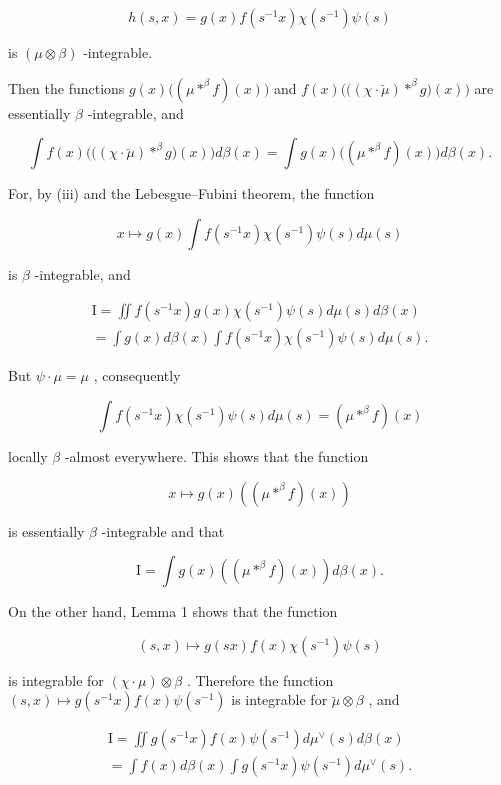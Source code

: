 \[
h (s, x) = g (x) f \left(s ^ {- 1} x\right) \chi \left(s ^ {- 1}\right) \psi (s)
\]

is \((\mu \otimes \beta)\) -integrable.

Then the functions \(g(x)\big((\mu * ^ {\beta} f)(x)\big)\) and \(f(x)\big(\big((\chi \cdot \breve{\mu}) * ^ {\beta} g\big)(x)\big)\) are essentially \(\beta\) -integrable, and

\[
\int f (x) \big (\big ((\chi \cdot \breve {\mu}) * ^ {\beta} g \big) (x) \big) d \beta (x) = \int g (x) \big ((\mu * ^ {\beta} f) (x) \big) d \beta (x).\tag{8}
\]

For, by (iii) and the Lebesgue--Fubini theorem, the function

\[
x \mapsto g (x) \int f (s ^ {- 1} x) \chi (s ^ {- 1}) \psi (s) d \mu (s)
\]

is \(\beta\) -integrable, and

\[
\begin{array}{l} \mathrm{I} = \iint f (s ^ {- 1} x) g (x) \chi (s ^ {- 1}) \psi (s) d \mu (s) d \beta (x) \\ = \int g (x) d \beta (x) \int f (s ^ {- 1} x) \chi (s ^ {- 1}) \psi (s) d \mu (s). \end{array}
\]

But \(\psi \cdot \mu = \mu\) , consequently

\[
\int f (s ^ {- 1} x) \chi (s ^ {- 1}) \psi (s) d \mu (s) = (\mu * ^ {\beta} f) (x)
\]

locally \(\beta\) -almost everywhere. This shows that the function

\[
x \mapsto g (x) \left(\left(\mu * ^ {\beta} f\right) (x)\right)
\]

is essentially \(\beta\) -integrable and that

\[
\mathrm{I} = \int g (x) \left(\left(\mu * ^ {\beta} f\right) (x)\right) d \beta (x).
\]

On the other hand, Lemma 1 shows that the function

\[
(s, x) \mapsto g (s x) f (x) \chi (s ^ {- 1}) \psi (s)
\]

is integrable for \((\chi \cdot \mu) \otimes \beta\) . Therefore the function \((s, x) \mapsto g(s^{-1}x)f(x)\psi(s^{-1})\) is integrable for \(\breve{\mu} \otimes \beta\) , and

\[
\begin{array}{l} \mathrm{I} = \iint g (s ^ {- 1} x) f (x) \psi (s ^ {- 1}) d \mu^ {\vee} (s) d \beta (x) \\ = \int f (x) d \beta (x) \int g (s ^ {- 1} x) \psi (s ^ {- 1}) d \mu^ {\vee} (s). \end{array}
\]

